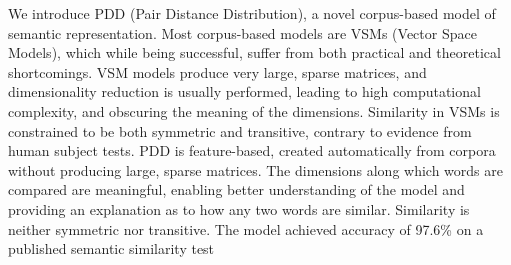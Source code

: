 We introduce PDD (Pair Distance Distribution), a novel corpus-based model of semantic representation. Most corpus-based models are VSMs (Vector Space Models), which while being successful, suffer from both practical and theoretical shortcomings. VSM models produce very large, sparse matrices, and dimensionality reduction is usually performed, leading to high computational complexity, and obscuring the meaning of the dimensions. Similarity in VSMs is constrained to be both symmetric and transitive, contrary to evidence from human subject tests. PDD is feature-based, created automatically from corpora without producing large, sparse matrices. The dimensions along which words are compared are meaningful, enabling better understanding of the model and providing an explanation as to how any two words are similar. Similarity is neither symmetric nor transitive. The model achieved accuracy of 97.6\% on a published semantic similarity test
